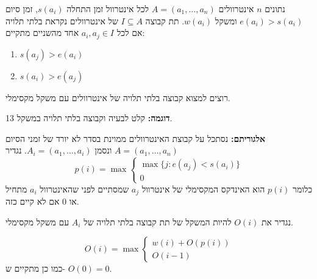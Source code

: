 נתונים $n$ אינטרוולים
$A = (a_1,\ldots,a_n)$
לכל אינטרוול זמן התחלה 
$s(a_i)$,
זמן סיום
$e(a_i) > s(a_i)$
ומשקל
$w(a_i)$.
תת קבוצה 
$I \subseteq A$
של אינטרוולים  נקראת בלתי תלויה אם לכל 
$a_i, a_j \in I$
אחד מהשניים מתקיים:
\begin{enumerate}
\item
$s(a_j) > e(a_i)$
\item
$s(a_i) > e(a_j)$
\end{enumerate}

רוצים למצוא קבוצה בלתי תלויה של אינטרוולים עם משקל מקסימלי.

\textbf{דוגמה:}
קלט לבעיה וקבוצה בלתי תלויה במשקל 13.
\begin{center}
\end{center}


\textbf{אלגוריתם:}
נסתכל על קבוצת האינטרוולים ממוינת בסדר לא יורד של זמני הסיום
$A = (a_1,\ldots,a_n)$
ונסמן 
$A_i = (a_1,\ldots,a_i)$.
נגדיר
$$p(i) = \max
\begin{cases}
\max \{j : e(a_j) < s(a_i)\}
\\
0
\end{cases}
$$
כלומר 
$p(i)$
הוא האינדקס המקסימלי של אינטרוול
$a_j$
שמסתיים לפני שהאינטרוול 
$a_i$
מתחיל או 0 אם לא קיים כזה.

נגדיר את 
$O(i)$
להיות המשקל של תת קבוצה בלתי תלויה של 
$A_i$
עם משקל מקסימלי.

\begin{claim}
$$
O(i) = \max
\begin{cases}
w(i) + O(p(i))
\\
O(i - 1)
\end{cases}
$$
כמו כן מתקיים ש-%
$O(0) = 0$.
\end{claim}

